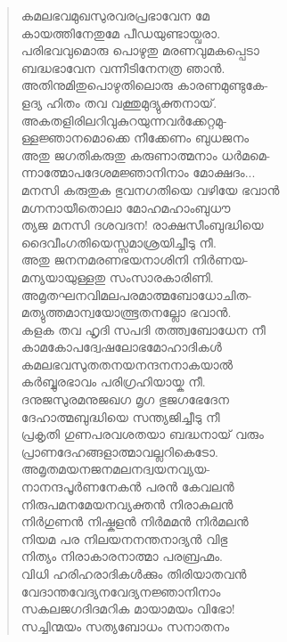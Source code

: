 \begin{verse}
കമലഭവമുഖസുരവരപ്രഭാവേന മേ\\
കായത്തിനേതുമേ പീഡയുണ്ടായ്വരാ.\\
പരിഭവവുമൊരു പൊഴുതു മരണവുമകപ്പെടാ\\
ബദ്ധഭാവേന വന്നീടിനേനത്ര ഞാന്‍.\\
അതിനുമിതുപൊഴുതിലൊരു കാരണമുണ്ടുകേ-\\
ളദ്യ ഹിതം തവ വക്തുമുദ്യുക്തനായ്.\\
അകതളിരിലറിവുകുറയുന്നവര്‍ക്കേറ്റമു-\\
ള്ളജ്ഞാനമൊക്കെ നീക്കേണം ബുധജനം\\
അതു ജഗതികരുതു കരുണാത്മനാം ധര്‍മമെ-\\
ന്നാത്മോപദേശമജ്ഞാനിനാം മോക്ഷദം...\\
മനസി കരുതുക ഭുവനഗതിയെ വഴിയേ ഭവാന്‍\\
മഗ്നനായീതൊലാ മോഹമഹാംബുധൗ\\
ത്യജ മനസി ദശവദന! രാക്ഷസീംബുദ്ധിയെ\\
ദൈവീംഗതിയെസ്സമാശ്രയിച്ചീടു നീ.\\
അതു ജനനമരണഭയനാശിനി നിര്‍ണയ-\\
മന്യയായുള്ളതു സംസാരകാരിണി.\\
അമൃതഘനവിമലപരമാത്മബോധോചിത-\\
മത്യുത്തമാന്വയോത്ഭൂതനല്ലോ ഭവാന്‍.\\
കളക തവ ഹൃദി സപദി തത്ത്വബോധേന നീ\\
കാമകോപദ്വേഷലോഭമോഹാദികള്‍\\
കമലഭവസുതതനയനന്ദനനാകയാല്‍\\
കര്‍ബ്ബുരഭാവം പരിഗ്രഹിയായ്ക നീ.\\
ദനുജസുരമനുജഖഗ മൃഗ ഭുജഗഭേദേന\\
ദേഹാത്മബുദ്ധിയെ സന്ത്യജിച്ചീടു നീ\\
പ്രകൃതി ഗുണപരവശതയാ ബദ്ധനായ് വരും\\
പ്രാണദേഹങ്ങളാത്മാവല്ലറികെടോ.\\
അമൃതമയനജനമലനദ്വയനവ്യയ-\\
നാനന്ദപൂര്‍ണനേകന്‍ പരന്‍ കേവലന്‍\\
നിരുപമനമേയനവ്യക്തന്‍ നിരാകുലന്‍\\
നിര്‍ഗുണന്‍ നിഷ്കളന്‍ നിര്‍മമന്‍ നിര്‍മലന്‍\\
നിയമ പര നിലയനനന്തനാദ്യന്‍ വിഭു\\
നിത്യം നിരാകാരനാത്മാ പരബ്രഹ്മം.\\
വിധി ഹരിഹരാദികള്‍ക്കും തിരിയാതവന്‍\\
വേദാന്തവേദ്യനവേദ്യനജ്ഞാനിനാം\\
സകലജഗദിദമറിക മായാമയം വിഭോ!\\
സച്ചിന്മയം സത്യബോധം സനാതനം\\

\end{verse}
